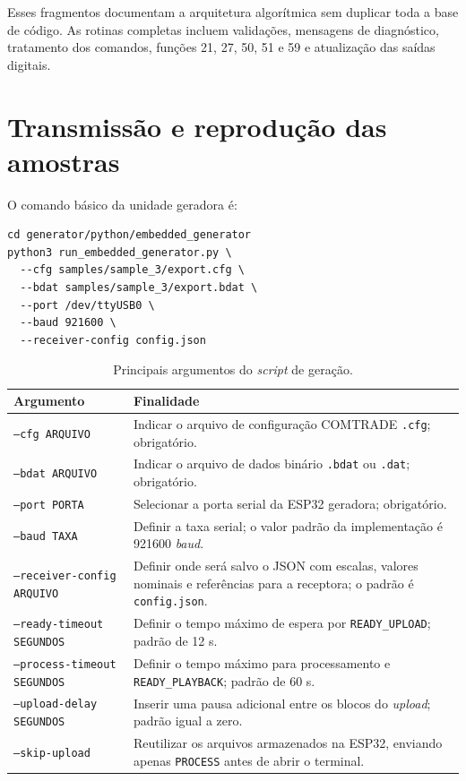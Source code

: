 Esses fragmentos documentam a arquitetura algorítmica sem duplicar toda a base de código. As rotinas completas incluem validações, mensagens de diagnóstico, tratamento dos comandos, funções 21, 27, 50, 51 e 59 e atualização das saídas digitais.

\section{Transmissão e reprodução das amostras}

O comando básico da unidade geradora é:

\begin{verbatim}
cd generator/python/embedded_generator
python3 run_embedded_generator.py \
  --cfg samples/sample_3/export.cfg \
  --bdat samples/sample_3/export.bdat \
  --port /dev/ttyUSB0 \
  --baud 921600 \
  --receiver-config config.json
\end{verbatim}

\begin{table}[H]
  \centering
  \small
  \caption{Principais argumentos do \textit{script} de geração.}
  \begin{tabular}{p{4.8cm}p{8.4cm}}
    \toprule
    Argumento & Finalidade \\
    \midrule
    \texttt{--cfg ARQUIVO} & Indicar o arquivo de configuração COMTRADE \texttt{.cfg}; obrigatório. \\
    \texttt{--bdat ARQUIVO} & Indicar o arquivo de dados binário \texttt{.bdat} ou \texttt{.dat}; obrigatório. \\
    \texttt{--port PORTA} & Selecionar a porta serial da ESP32 geradora; obrigatório. \\
    \texttt{--baud TAXA} & Definir a taxa serial; o valor padrão da implementação é 921600 \textit{baud}. \\
    \texttt{--receiver-config ARQUIVO} & Definir onde será salvo o JSON com escalas, valores nominais e referências para a receptora; o padrão é \texttt{config.json}. \\
    \texttt{--ready-timeout SEGUNDOS} & Definir o tempo máximo de espera por \texttt{READY\_UPLOAD}; padrão de 12 s. \\
    \texttt{--process-timeout SEGUNDOS} & Definir o tempo máximo para processamento e \texttt{READY\_PLAYBACK}; padrão de 60 s. \\
    \texttt{--upload-delay SEGUNDOS} & Inserir uma pausa adicional entre os blocos do \textit{upload}; padrão igual a zero. \\
    \texttt{--skip-upload} & Reutilizar os arquivos armazenados na ESP32, enviando apenas \texttt{PROCESS} antes de abrir o terminal. \\
    \bottomrule
  \end{tabular}
  \legend{Fonte: Autoria própria.}
\end{table}

